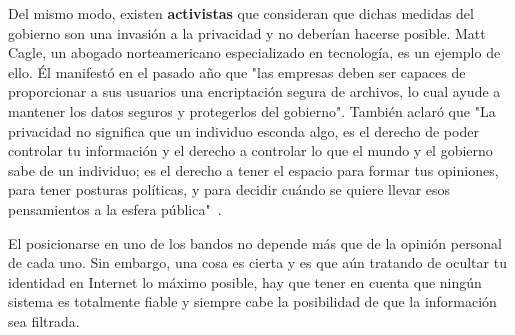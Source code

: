 Del mismo modo, existen \textbf{activistas} que consideran que dichas medidas del gobierno son una invasión a la privacidad y no deberían hacerse posible. Matt Cagle, un abogado norteamericano especializado en tecnología, es un ejemplo de ello. Él manifestó en el pasado año que "las empresas deben ser capaces de proporcionar a sus usuarios una encriptación segura de archivos, lo cual ayude a mantener los datos seguros y protegerlos del gobierno". También aclaró que "La privacidad no significa que un individuo esconda algo, es el derecho de poder controlar tu información y el derecho a controlar lo que el mundo y el gobierno sabe de un individuo; es el derecho a tener el espacio para formar tus opiniones, para tener posturas políticas, y para decidir cuándo se quiere llevar esos pensamientos a la esfera pública"~\cite{article:matt}.

El posicionarse en uno de los bandos no depende más que de la opinión personal de cada uno. Sin embargo, una cosa es cierta y es que aún tratando de ocultar tu identidad en Internet lo máximo posible, hay que tener en cuenta que ningún sistema es totalmente fiable y siempre cabe la posibilidad de que la información sea filtrada.

